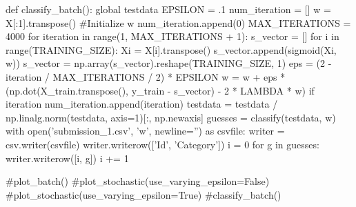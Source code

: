 \documentclass{article}
\begin{document}
\begin{python}
def classify_batch():
    global testdata
    EPSILON = .1
    num_iteration = []
    w = X[:1].transpose() #Initialize w
    num_iteration.append(0)
    MAX_ITERATIONS = 4000
    for iteration in range(1, MAX_ITERATIONS + 1):
        s_vector = []
        for i in range(TRAINING_SIZE):
            Xi = X[i].transpose()
            s_vector.append(sigmoid(Xi, w))
        s_vector = np.array(s_vector).reshape(TRAINING_SIZE, 1)
        eps = (2 - iteration / MAX_ITERATIONS / 2) * EPSILON
        w = w + eps * (np.dot(X_train.transpose(), y_train - s_vector)
            - 2 * LAMBDA * w)
        if iteration %
            num_iteration.append(iteration)
    testdata = testdata / np.linalg.norm(testdata, axis=1)[:, np.newaxis]
    guesses = classify(testdata, w)
    with open('submission_1.csv', 'w', newline='') as csvfile:
        writer = csv.writer(csvfile)
        writer.writerow(['Id', 'Category'])
        i = 0
        for g in guesses:
            writer.writerow([i, g])
            i += 1

#plot_batch()
#plot_stochastic(use_varying_epsilon=False)
#plot_stochastic(use_varying_epsilon=True)
#classify_batch()
\end{python}
\end{document}
